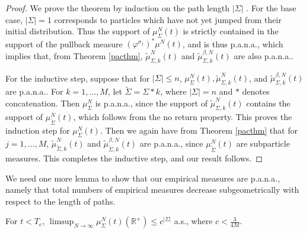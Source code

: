 \begin{proof}We prove the theorem by induction on the path length $|\Sigma|$ .  For the base case,   $|\Sigma|= 1$ corresponds to particles which have not yet jumped from their initial distribution.  Thus the support of $\mu_\Sigma^N(t)$ is strictly contained in the support of the pullback measure $(\varphi^{\sigma_1})^*\mu^N(t)$, and is thus p.a.n.a., which implies that, from Theorem \ref{pacthm}, $\tilde \mu^N_{\Sigma,k}(t)$ and $\tilde \mu^{\beta,N}_{\Sigma,k}(t)$ are also p.a.n.a..

For the inductive step, suppose that for $|\Sigma|\le n$, $\mu^N_\Sigma(t), \tilde \mu^N_{\Sigma,k}(t)$, and $\tilde \mu^{\beta,N}_{\Sigma,k}(t)$ are p.a.n.a.. 
 For $k = 1, \dots, M$, let  $\tilde\Sigma = \Sigma *k$, where $|\Sigma|= n$ and $*$ denotes concatenation. Then $\mu^N_\Sigma$ is p.a.n.a., since the support of $\tilde \mu^N_{\Sigma,k}(t)$  contains the support of  $\mu_{\tilde \Sigma}^N(t)$, which follows from the no return property. This proves the induction step for $\mu^N_\Sigma(t)$.  Then we again have from  Theorem \ref{pacthm} that for $j =  1, \dots, M$, $\tilde \mu^N_{\tilde \Sigma,k}(t)$ and $\tilde \mu^{\beta,N}_{\tilde \Sigma,k}(t)$ are p.a.n.a., since $\mu^N_{\tilde \Sigma}(t)$ are subparticle measures. This completes the inductive step, and our result follows.    
\end{proof}

We need one more lemma to show that our empirical measures are p.a.n.a., namely that total numbers of empirical measures decrease subgeometrically with respect to  the length of paths.

\begin{lem}\label{geometric} For $t< T_e$,   $ \limsup_{N\rightarrow \infty} \mu_{ \Sigma}^N(t)(\mathbb{R}^+)\le c^{|\Sigma|}$ a.s., where  $c<\frac3{4M}$.
\end{lem}

